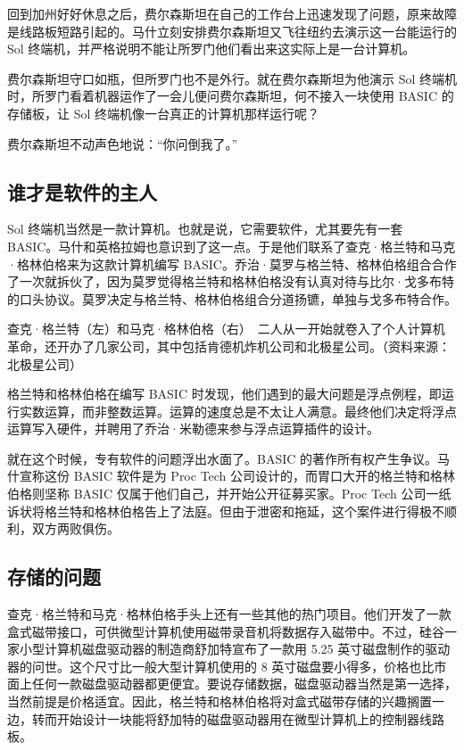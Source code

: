 \documentclass[12pt,UTF8]{ctexbook}
\begin{document}
回到加州好好休息之后，费尔森斯坦在自己的工作台上迅速发现了问题，原来故障是线路板短路引起的。马什立刻安排费尔森斯坦又飞往纽约去演示这一台能运行的 Sol 终端机，并严格说明不能让所罗门他们看出来这实际上是一台计算机。

费尔森斯坦守口如瓶，但所罗门也不是外行。就在费尔森斯坦为他演示 Sol 终端机时，所罗门看着机器运作了一会儿便问费尔森斯坦，何不接入一块使用 BASIC 的存储板，让 Sol 终端机像一台真正的计算机那样运行呢？

费尔森斯坦不动声色地说：“你问倒我了。”





\subsection{谁才是软件的主人}


Sol 终端机当然是一款计算机。也就是说，它需要软件，尤其要先有一套 BASIC。马什和英格拉姆也意识到了这一点。于是他们联系了查克·格兰特和马克·格林伯格来为这款计算机编写 BASIC。乔治·莫罗与格兰特、格林伯格组合合作了一次就拆伙了，因为莫罗觉得格兰特和格林伯格没有认真对待与比尔·戈多布特的口头协议。莫罗决定与格兰特、格林伯格组合分道扬镳，单独与戈多布特合作。



查克·格兰特（左）和马克·格林伯格（右）　二人从一开始就卷入了个人计算机革命，还开办了几家公司，其中包括肯德机炸机公司和北极星公司。（资料来源：北极星公司）

格兰特和格林伯格在编写 BASIC 时发现，他们遇到的最大问题是浮点例程，即运行实数运算，而非整数运算。运算的速度总是不太让人满意。最终他们决定将浮点运算写入硬件，并聘用了乔治·米勒德来参与浮点运算插件的设计。

就在这个时候，专有软件的问题浮出水面了。BASIC 的著作所有权产生争议。马什宣称这份 BASIC 软件是为 Proc Tech 公司设计的，而胃口大开的格兰特和格林伯格则坚称 BASIC 仅属于他们自己，并开始公开征募买家。Proc Tech 公司一纸诉状将格兰特和格林伯格告上了法庭。但由于泄密和拖延，这个案件进行得极不顺利，双方两败俱伤。





\subsection{存储的问题}


查克·格兰特和马克·格林伯格手头上还有一些其他的热门项目。他们开发了一款盒式磁带接口，可供微型计算机使用磁带录音机将数据存入磁带中。不过，硅谷一家小型计算机磁盘驱动器的制造商舒加特宣布了一款用 5.25 英寸磁盘制作的驱动器的问世。这个尺寸比一般大型计算机使用的 8 英寸磁盘要小得多，价格也比市面上任何一款磁盘驱动器都更便宜。要说存储数据，磁盘驱动器当然是第一选择，当然前提是价格适宜。因此，格兰特和格林伯格将对盒式磁带存储的兴趣搁置一边，转而开始设计一块能将舒加特的磁盘驱动器用在微型计算机上的控制器线路板。
\end{document}
